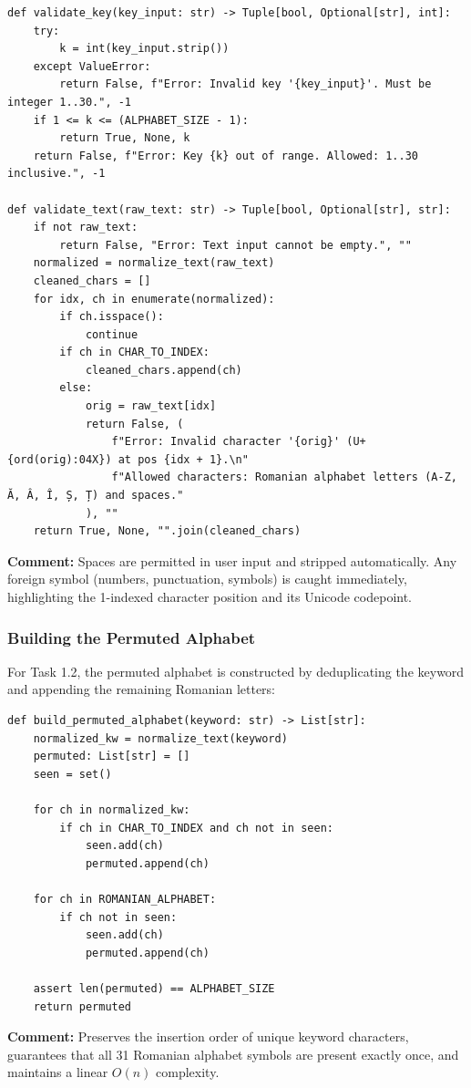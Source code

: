 \documentclass{labreport}
\begin{document}
\begin{lstlisting}[style=python]
def validate_key(key_input: str) -> Tuple[bool, Optional[str], int]:
    try:
        k = int(key_input.strip())
    except ValueError:
        return False, f"Error: Invalid key '{key_input}'. Must be integer 1..30.", -1
    if 1 <= k <= (ALPHABET_SIZE - 1):
        return True, None, k
    return False, f"Error: Key {k} out of range. Allowed: 1..30 inclusive.", -1

def validate_text(raw_text: str) -> Tuple[bool, Optional[str], str]:
    if not raw_text:
        return False, "Error: Text input cannot be empty.", ""
    normalized = normalize_text(raw_text)
    cleaned_chars = []
    for idx, ch in enumerate(normalized):
        if ch.isspace():
            continue
        if ch in CHAR_TO_INDEX:
            cleaned_chars.append(ch)
        else:
            orig = raw_text[idx]
            return False, (
                f"Error: Invalid character '{orig}' (U+{ord(orig):04X}) at pos {idx + 1}.\n"
                f"Allowed characters: Romanian alphabet letters (A-Z, Ă, Â, Î, Ș, Ț) and spaces."
            ), ""
    return True, None, "".join(cleaned_chars)
\end{lstlisting}
\textbf{Comment:} Spaces are permitted in user input and stripped automatically. Any foreign symbol (numbers, punctuation, symbols) is caught immediately, highlighting the 1-indexed character position and its Unicode codepoint.

\subsubsection{Building the Permuted Alphabet}
For Task 1.2, the permuted alphabet is constructed by deduplicating the keyword and appending the remaining Romanian letters:

\begin{lstlisting}[style=python]
def build_permuted_alphabet(keyword: str) -> List[str]:
    normalized_kw = normalize_text(keyword)
    permuted: List[str] = []
    seen = set()

    for ch in normalized_kw:
        if ch in CHAR_TO_INDEX and ch not in seen:
            seen.add(ch)
            permuted.append(ch)

    for ch in ROMANIAN_ALPHABET:
        if ch not in seen:
            seen.add(ch)
            permuted.append(ch)

    assert len(permuted) == ALPHABET_SIZE
    return permuted
\end{lstlisting}
\textbf{Comment:} Preserves the insertion order of unique keyword characters, guarantees that all 31 Romanian alphabet symbols are present exactly once, and maintains a linear $O(n)$ complexity.
\end{document}
